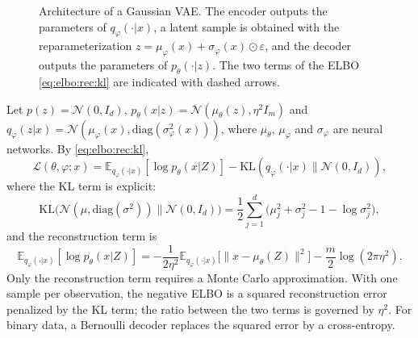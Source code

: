 \documentclass[english,graybox,envcountchap,envcountsame,sectrefs,shortlabels]{svmono}
\theoremstyle{style}
\newcommand{\gauss}{\mathcal{N}}
\newcommand{\eqsp}{}
\begin{document}
\begin{figure}
\centering
{}
\caption{Architecture of a Gaussian VAE. The encoder outputs the parameters of $q_\varphi(\cdot|x)$, a latent sample is obtained with the reparameterization $z = \mu_\varphi(x)+\sigma_\varphi(x)\odot\varepsilon$, and the decoder outputs the parameters of $p_\theta(\cdot|z)$. The two terms of the ELBO \eqref{eq:elbo:rec:kl} are indicated with dashed arrows.}
\label{fig:vae}
\end{figure}

\begin{example}
\label{ex:gaussian:vae}
Let $p(z) = \gauss(0,I_d)$, $p_\theta(x|z) = \gauss(\mu_\theta(z),\eta^2I_m)$ and $q_\varphi(z|x) = \gauss(\mu_\varphi(x),\mathrm{diag}(\sigma^2_\varphi(x)))$, where $\mu_\theta$, $\mu_\varphi$ and $\sigma_\varphi$ are neural networks. By \eqref{eq:elbo:rec:kl},
$$
\mathcal{L}(\theta,\varphi;x) = \mathbb{E}_{q_\varphi(\cdot|x)}[\log p_\theta(x|Z)] - \mathrm{KL}(q_\varphi(\cdot|x)\|\gauss(0,I_d))\eqsp,
$$
where the KL term is explicit:
$$
\mathrm{KL}\big(\gauss(\mu,\mathrm{diag}(\sigma^2))\|\gauss(0,I_d)\big) = \frac12\sum_{j=1}^d\big(\mu_j^2+\sigma_j^2-1-\log\sigma_j^2\big)\eqsp,
$$
and the reconstruction term is
$$
\mathbb{E}_{q_\varphi(\cdot|x)}[\log p_\theta(x|Z)] = -\frac{1}{2\eta^2}\mathbb{E}_{q_\varphi(\cdot|x)}\big[\|x-\mu_\theta(Z)\|^2\big] - \frac m2\log(2\pi\eta^2)\eqsp.
$$
Only the reconstruction term requires a Monte Carlo approximation. With one sample per observation, the negative ELBO is a squared reconstruction error penalized by the KL term; the ratio between the two terms is governed by $\eta^2$. For binary data, a Bernoulli decoder replaces the squared error by a cross-entropy.
\end{example}
\end{document}
